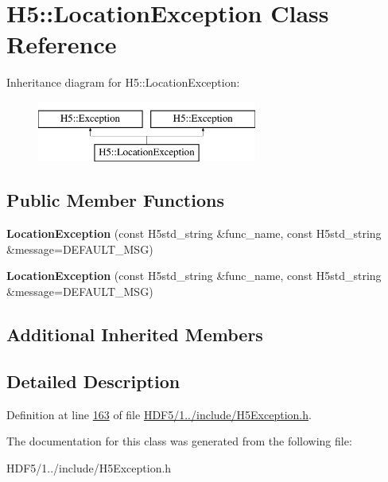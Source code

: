 \hypertarget{class_h5_1_1_location_exception}{}\section{H5\+:\+:Location\+Exception Class Reference}
\label{class_h5_1_1_location_exception}
Inheritance diagram for H5\+:\+:Location\+Exception\+:\begin{figure}[H]
\begin{center}
\leavevmode
\includegraphics[height=2.000000cm]{class_h5_1_1_location_exception}
\end{center}
\end{figure}
\subsection*{Public Member Functions}
\begin{DoxyCompactItemize}
\item 
\mbox{\label{class_h5_1_1_location_exception_a71fe610d8fc66d904dc51f9d6bcd4b58}} 
{\bfseries Location\+Exception} (const H5std\+\_\+string \&func\+\_\+name, const H5std\+\_\+string \&message=D\+E\+F\+A\+U\+L\+T\+\_\+\+M\+SG)
\item 
\mbox{\label{class_h5_1_1_location_exception_a71fe610d8fc66d904dc51f9d6bcd4b58}} 
{\bfseries Location\+Exception} (const H5std\+\_\+string \&func\+\_\+name, const H5std\+\_\+string \&message=D\+E\+F\+A\+U\+L\+T\+\_\+\+M\+SG)
\end{DoxyCompactItemize}
\subsection*{Additional Inherited Members}


\subsection{Detailed Description}


Definition at line \hyperlink{_h_d_f5_21_810_81_2include_2_h5_exception_8h_source_l00163}{163} of file \hyperlink{_h_d_f5_21_810_81_2include_2_h5_exception_8h_source}{H\+D\+F5/1../include/\+H5\+Exception.\+h}.



The documentation for this class was generated from the following file\+:\begin{DoxyCompactItemize}
\item 
H\+D\+F5/1../include/\+H5\+Exception.\+h\end{DoxyCompactItemize}
